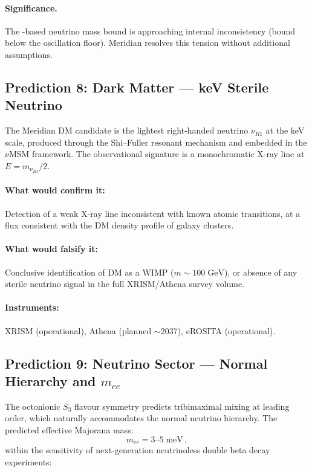 \paragraph{Significance.} The \LCDM-based neutrino mass bound is approaching internal inconsistency (bound below the oscillation floor). Meridian resolves this tension without additional assumptions.

\subsection{Prediction 8: Dark Matter --- keV Sterile Neutrino}
\label{sec:2-pred8}

The Meridian DM candidate is the lightest right-handed neutrino $\nu_{R1}$ at the keV scale, produced through the Shi--Fuller resonant mechanism and embedded in the $\nu$MSM framework. The observational signature is a monochromatic X-ray line at $E = m_{\nu_{R1}}/2$.

\paragraph{What would confirm it:} Detection of a weak X-ray line inconsistent with known atomic transitions, at a flux consistent with the DM density profile of galaxy clusters.

\paragraph{What would falsify it:} Conclusive identification of DM as a WIMP ($m \sim 100\;\mathrm{GeV}$), or absence of any sterile neutrino signal in the full XRISM/Athena survey volume.

\paragraph{Instruments:} XRISM (operational), Athena (planned $\sim$2037), eROSITA (operational).

\subsection{Prediction 9: Neutrino Sector --- Normal Hierarchy and $m_{ee}$}
\label{sec:2-pred9}

The octonionic $S_3$ flavour symmetry predicts tribimaximal mixing at leading order, which naturally accommodates the normal neutrino hierarchy. The predicted effective Majorana mass:
\begin{equation}
m_{ee} = 3\text{--}5\;\mathrm{meV}\,,
\end{equation}
within the sensitivity of next-generation neutrinoless double beta decay experiments:

